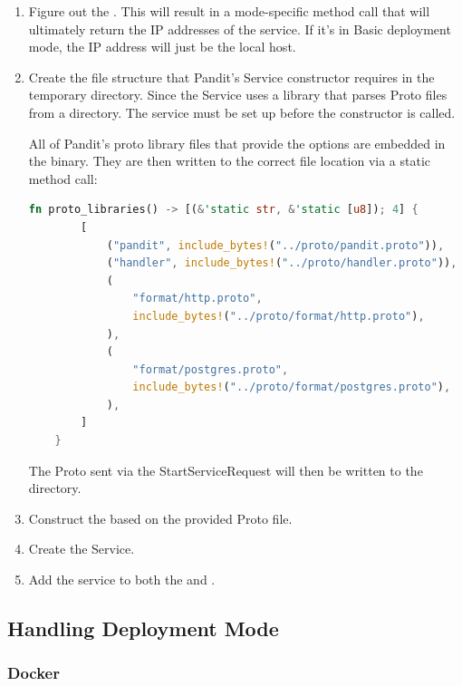 \documentclass[a4paper,12pt]{report}
\begin{document}
\begin{enumerate}
    \item Figure out the . This will result in a mode-specific method call that will ultimately return the IP addresses of the service. If it's in Basic deployment mode, the IP address will just be the local host.
    
    \item Create the file structure that Pandit's Service constructor requires in the temporary directory. Since the Service uses a library that parses Proto files from a directory. The service must be set up before the constructor is called.
    
    All of Pandit's proto library files that provide the options are embedded in the binary. They are then written to the correct file location via a static method call:
    
    \begin{lstlisting}[language=Rust]
    fn proto_libraries() -> [(&'static str, &'static [u8]); 4] {
        [
            ("pandit", include_bytes!("../proto/pandit.proto")),
            ("handler", include_bytes!("../proto/handler.proto")),
            (
                "format/http.proto",
                include_bytes!("../proto/format/http.proto"),
            ),
            (
                "format/postgres.proto",
                include_bytes!("../proto/format/postgres.proto"),
            ),
        ]
    }
    \end{lstlisting}
    
    The Proto sent via the StartServiceRequest will then be written to the directory.
    
    \item Construct the  based on the provided Proto file.
    
    \item Create the Service.
    
    \item Add the service to both the  and .
\end{enumerate}

\subsection{Handling Deployment Mode}
\subsubsection{Docker}
\end{document}
